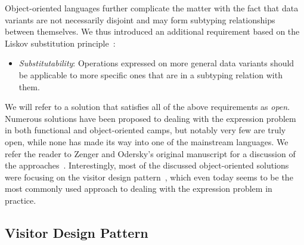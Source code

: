 
\noindent
Object-oriented languages further complicate the matter with the fact that 
data variants are not necessarily disjoint and may form subtyping relationships  
between themselves. We thus introduced an additional requirement based on the
Liskov substitution principle~\cite{Lis87}:

\begin{itemize}
\setlength{\itemsep}{0pt}
\setlength{\parskip}{0pt}
\item \emph{Substitutability}: Operations expressed on more general data variants
      should be applicable to more specific ones that are in a subtyping relation 
      with them.
\end{itemize}


\noindent
We will refer to a solution that satisfies all of the above requirements as \emph{open}. 
Numerous solutions have been proposed to dealing with the expression problem in both 
functional and object-oriented camps, but notably very few are truly open, while 
none has made its way into one of the mainstream languages. We refer the reader 
to Zenger and Odersky's original manuscript for a discussion of the 
approaches~\cite{fool12}. Interestingly, most of the discussed object-oriented 
solutions were focusing on the visitor design pattern~\cite{DesignPatterns1993}, 
which even today seems to be the most commonly used approach to dealing with the 
expression problem in practice.

\subsection{Visitor Design Pattern}
\label{sec:vdp}


